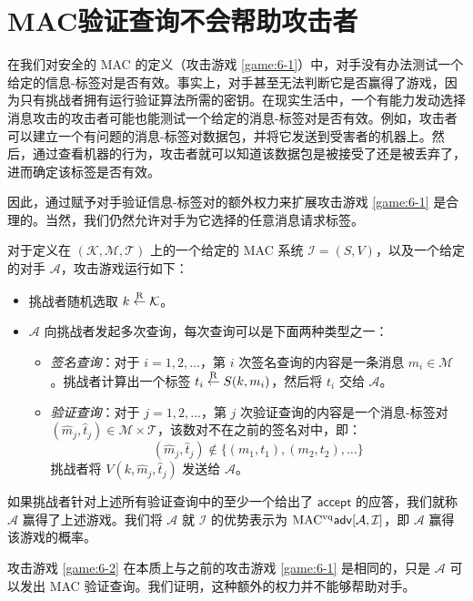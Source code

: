 \section{MAC验证查询不会帮助攻击者}\label{sec:6-2}

在我们对安全的 MAC 的定义（攻击游戏 \ref{game:6-1}）中，对手没有办法测试一个给定的信息-标签对是否有效。事实上，对手甚至无法判断它是否赢得了游戏，因为只有挑战者拥有运行验证算法所需的密钥。在现实生活中，一个有能力发动选择消息攻击的攻击者可能也能测试一个给定的消息-标签对是否有效。例如，攻击者可以建立一个有问题的消息-标签对数据包，并将它发送到受害者的机器上。然后，通过查看机器的行为，攻击者就可以知道该数据包是被接受了还是被丢弃了，进而确定该标签是否有效。

因此，通过赋予对手验证信息-标签对的额外权力来扩展攻击游戏 \ref{game:6-1} 是合理的。当然，我们仍然允许对手为它选择的任意消息请求标签。

\begin{game}\label{game:6-2}
对于定义在 $(\mathcal{K},\mathcal{M},\mathcal{T})$ 上的一个给定的 MAC 系统 $\mathcal{I}=(S,V)$，以及一个给定的对手 $\mathcal{A}$，攻击游戏运行如下：
\begin{itemize}
	\item 挑战者随机选取 $k\overset{\rm R}\leftarrow\mathcal{K}$。
	\item $\mathcal{A}$ 向挑战者发起多次查询，每次查询可以是下面两种类型之一：
	\begin{itemize}
		\item \emph{签名查询}：对于 $i=1,2,\dots$，第 $i$ 次签名查询的内容是一条消息 $m_i\in\mathcal{M}$。挑战者计算出一个标签 $t_i\overset{\rm R}\leftarrow S(k,m_i)$，然后将 $t_i$ 交给 $\mathcal{A}$。
		\item \emph{验证查询}：对于 $j=1,2,\dots$，第 $j$ 次验证查询的内容是一个消息-标签对 $(\hat m_j,\hat t_j)\in\mathcal{M}\times\mathcal{T}$，该数对不在之前的签名对中，即：
		\[(\hat m_j,\hat t_j)\notin\{(m_1,t_1),(m_2,t_2),\dots\}\]
		挑战者将 $V(k,\hat m_j,\hat t_j)$ 发送给 $\mathcal{A}$。
	\end{itemize}
\end{itemize}
如果挑战者针对上述所有验证查询中的至少一个给出了 $\mathsf{accept}$ 的应答，我们就称 $\mathcal{A}$ 赢得了上述游戏。我们将 $\mathcal{A}$ 就 $\mathcal{I}$ 的优势表示为 ${\rm MAC^{vq}}\mathsf{adv}[\mathcal{A},\mathcal{I}]$，即 $\mathcal{A}$ 赢得该游戏的概率。
\end{game}

\begin{snote}[两个定义是等价的。]
攻击游戏 \ref{game:6-2} 在本质上与之前的攻击游戏 \ref{game:6-1} 是相同的，只是 $\mathcal{A}$ 可以发出 MAC 验证查询。我们证明，这种额外的权力并不能够帮助对手。
\end{snote}

